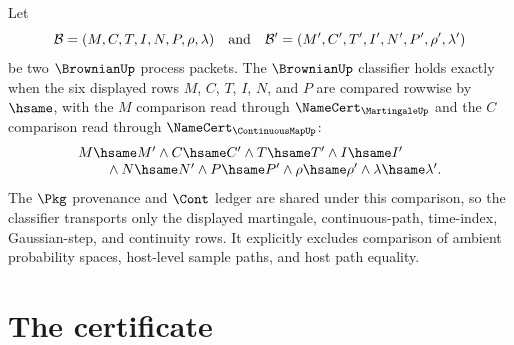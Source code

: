 \begin{definition}
\label{def:brownian-step-continuity-classifier}
Let
$$
\mathcal{B}=(M,C,T,I,N,P,\rho,\lambda)
\quad\hbox{and}\quad
\mathcal{B}'=(M',C',T',I',N',P',\rho',\lambda')
$$
be two $\BrownianUp$ process packets. The $\BrownianUp$ classifier holds
exactly when the six displayed rows $M$, $C$, $T$, $I$, $N$, and $P$ are
compared rowwise by $\hsame$, with the $M$ comparison read through
$\NameCert_{\MartingaleUp}$ and the $C$ comparison read through
$\NameCert_{\ContinuousMapUp}$:
$$
\begin{array}{l}
M\hsame M'\land C\hsame C'\land T\hsame T'\land I\hsame I'\\
\qquad{}\land N\hsame N'\land P\hsame P'\land \rho\hsame\rho'\land
\lambda\hsame\lambda'.
\end{array}
$$
The $\Pkg$ provenance and $\Cont$ ledger are shared under this comparison, so
the classifier transports only the displayed martingale, continuous-path,
time-index, Gaussian-step, and continuity rows. It explicitly excludes
comparison of ambient probability spaces, host-level sample paths, and host
path equality.
\end{definition}

\section{The certificate}
\label{sec:brownian-certificate}

